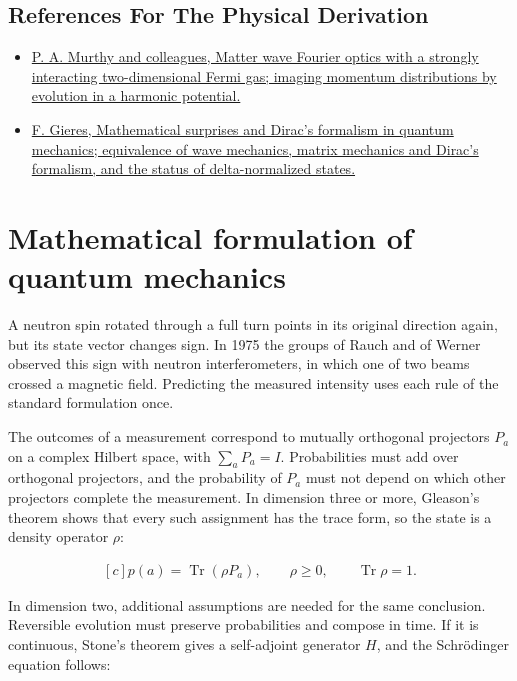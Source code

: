 \documentclass[11pt,oneside]{book}
\newenvironment{centeredalign}{\[\begin{gathered}[c]}{\end{gathered}\]}
\begin{document}
\subsection*{References For The Physical Derivation}
\begin{itemize}
\item \href{https://arxiv.org/abs/1408.4680}{P. A. Murthy and colleagues, Matter wave Fourier optics with a strongly interacting two-dimensional Fermi gas; imaging momentum distributions by evolution in a harmonic potential.}
\item \href{https://arxiv.org/abs/quant-ph/9907069}{F. Gieres, Mathematical surprises and Dirac's formalism in quantum mechanics; equivalence of wave mechanics, matrix mechanics and Dirac's formalism, and the status of delta-normalized states.}
\end{itemize}





\clearpage

\section{Mathematical formulation of quantum mechanics}

\label{topic:mathematical-formulation-of-quantum-mechanics}

A neutron spin rotated through a full turn points in its original direction again, but its state vector changes sign. In 1975 the groups of Rauch and of Werner observed this sign with neutron interferometers, in which one of two beams crossed a magnetic field. Predicting the measured intensity uses each rule of the standard formulation once.

The outcomes of a measurement correspond to mutually orthogonal projectors \(P_a\) on a complex Hilbert space, with \(\sum_aP_a=I\). Probabilities must add over orthogonal projectors, and the probability of \(P_a\) must not depend on which other projectors complete the measurement. In dimension three or more, Gleason's theorem shows that every such assignment has the trace form, so the state is a density operator \(\rho\):

\begin{centeredalign}
p(a)=\operatorname{Tr}(\rho P_a),\qquad \rho\geq0,\qquad \operatorname{Tr}\rho=1.
\end{centeredalign}

In dimension two, additional assumptions are needed for the same conclusion. Reversible evolution must preserve probabilities and compose in time. If it is continuous, Stone's theorem gives a self-adjoint generator \(H\), and the Schrödinger equation follows:
\end{document}
